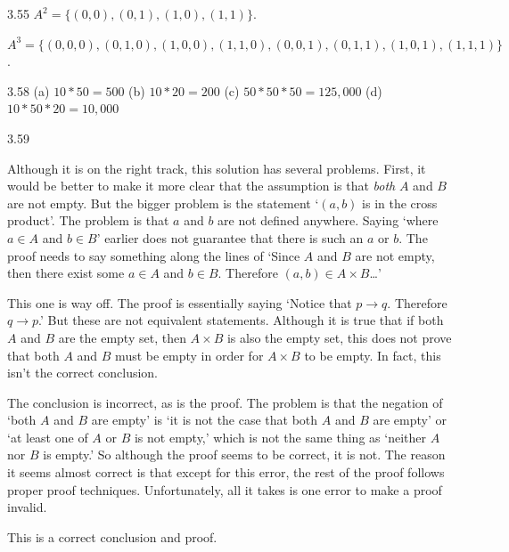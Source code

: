 \begin{Answer}{3.55}
$A^2=\{(0,0), (0,1), (1,0), (1,1)\}$.

\noindent
$A^3=\{(0,0,0), (0,1,0), (1,0,0), (1,1,0), (0,0,1), (0,1,1), (1,0,1), (1,1,1)\}$.
\end{Answer}
\begin{Answer}{3.58}
(a) $10*50=500$
(b) $10*20=200$
(c) $50*50*50=125,000$
(d) $10*50*20=10,000$
\end{Answer}
\begin{Answer}{3.59}
\begin{solevalenum}
\item
Although it is on the right track, this solution has several problems.  First, it would be better to make
it more clear that the assumption is that {\em both} $A$ and $B$ are not empty.
But the bigger problem is the statement `$(a,b)$ is in the cross product'.
The problem is that $a$ and $b$ are not defined anywhere.
Saying `where $a\in A$ and $b\in B$' earlier does not guarantee that there is such an $a$ or $b$.
The proof needs to say something along the lines of
`Since $A$ and $B$ are not empty, then there exist some $a\in A$ and $b\in B$.  Therefore
$(a,b)\in A\times B$\ldots'
\item
This one is way off.  The proof is essentially saying
`Notice that $p\rightarrow q$. Therefore $q\rightarrow p$.'  But these are not equivalent
statements.  Although it is true that if both $A$ and $B$ are the empty set, then $A\times B$ is
also the empty set, this does not prove that both $A$ and $B$ must be empty in order for $A\times B$
to be empty.  In fact, this isn't the correct conclusion.
\item
The conclusion is incorrect, as is the proof.
The problem is that the negation of
`both $A$ and $B$ are empty' is `it is not the case that both $A$ and $B$ are empty'
or `at least one of $A$ or $B$ is not empty,' which is not the same thing as
`neither $A$ nor $B$  is empty.'  So although the proof seems to be correct, it is not.
The reason it seems almost correct is that except for this error, the rest of the proof follows
proper proof techniques.  Unfortunately, all it takes is one error to make a proof invalid.
\item
This is a correct conclusion and proof.
\end{solevalenum}
\end{Answer}
